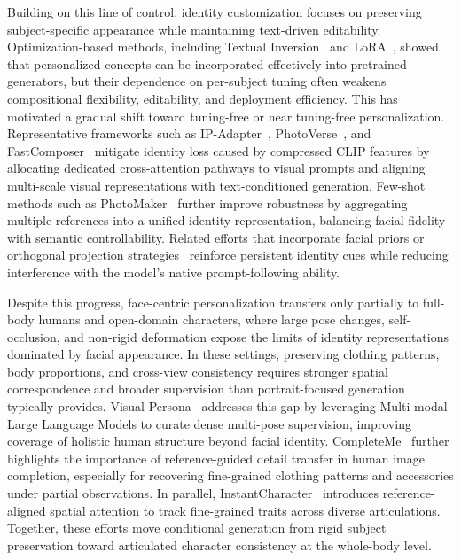 Building on this line of control, identity customization focuses on preserving subject-specific appearance while maintaining text-driven editability. Optimization-based methods, including Textual Inversion~\citep{gal2022image} and LoRA~\citep{hu2022lora}, showed that personalized concepts can be incorporated effectively into pretrained generators, but their dependence on per-subject tuning often weakens compositional flexibility, editability, and deployment efficiency. This has motivated a gradual shift toward tuning-free or near tuning-free personalization. Representative frameworks such as IP-Adapter~\citep{ye2023ip}, PhotoVerse~\citep{chen2023photoverse}, and FastComposer~\citep{xiao2025fastcomposer} mitigate identity loss caused by compressed CLIP features by allocating dedicated cross-attention pathways to visual prompts and aligning multi-scale visual representations with text-conditioned generation. Few-shot methods such as PhotoMaker~\citep{li2024photomaker} further improve robustness by aggregating multiple references into a unified identity representation, balancing facial fidelity with semantic controllability. Related efforts that incorporate facial priors or orthogonal projection strategies~\citep{wang2024instantid, guo2024pulid, shi2024instantbooth, zhou2024storymaker, mou2025dreamo} reinforce persistent identity cues while reducing interference with the model's native prompt-following ability.



Despite this progress, face-centric personalization transfers only partially to full-body humans and open-domain characters, where large pose changes, self-occlusion, and non-rigid deformation expose the limits of identity representations dominated by facial appearance. In these settings, preserving clothing patterns, body proportions, and cross-view consistency requires stronger spatial correspondence and broader supervision than portrait-focused generation typically provides. Visual Persona~\citep{nam2025visual} addresses this gap by leveraging Multi-modal Large Language Models to curate dense multi-pose supervision, improving coverage of holistic human structure beyond facial identity. CompleteMe~\citep{tsai2025completeme} further highlights the importance of reference-guided detail transfer in human image completion, especially for recovering fine-grained clothing patterns and accessories under partial observations. In parallel, InstantCharacter~\citep{InstantCharacter} introduces reference-aligned spatial attention to track fine-grained traits across diverse articulations. Together, these efforts move conditional generation from rigid subject preservation toward articulated character consistency at the whole-body level.



